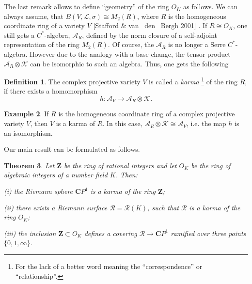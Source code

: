 \documentclass[10pt, reqno]{amsart}
\newtheorem{theorem}{Theorem}[section]
\theoremstyle{definition}
\newtheorem{definition}[theorem]{Definition}
\newtheorem{example}[theorem]{Example}
\theoremstyle{remark}
\numberwithin{equation}{section}
\begin{document}
The last remark  allows to define  ``geometry''  of the ring  $O_K$ as follows. 
We  can always assume,  that  $B(V, \mathcal{L}, \sigma)\cong M_2(R)$, 
where $R$ is the  homogeneous coordinate ring of a variety $V$ 
[Stafford \& van ~den ~Bergh 2001]  \cite[Section 8]{StaVdb1}. 
If $R\cong O_K$,  one still gets  a $C^*$-algebra,  $\mathscr{A}_R$,
 defined by  the norm closure of a self-adjoint representation of  the ring $M_2(R)$.
 Of course,  the  $\mathscr{A}_R$ is no longer 
a Serre $C^*$-algebra.  However  due to the analogy with a  base change,  the  tensor 
product $\mathscr{A}_R\otimes\mathscr{K}$ can be isomorphic  
to such an algebra.   Thus,  one gets  the following 
\begin{definition}
The complex projective variety $V$ is called a {\it karma}
\footnote{For the lack of a better word meaning the ``correspondence'' or ``relationship''.} 
 of the ring $R$, if there exists  a homomorphism 
 \begin{equation}
 h: \mathscr{A}_V\to\mathscr{A}_R\otimes\mathscr{K}. 
 \end{equation}
\end{definition}
\begin{example}
If $R$ is the homogeneous coordinate ring of a complex projective variety $V$, then 
$V$ is a karma of  $R$.  In this case,   $\mathscr{A}_R\otimes\mathscr{K}\cong\mathscr{A}_V$,
i.e. the map $h$ is an isomorphism. 
\end{example}
Our main result can be formulated as follows. 
\begin{theorem}\label{thm1.3}
Let $\mathbf{Z}$ be the ring of rational integers and let $O_K$ be the ring of algebraic 
integers of a number field $K$. Then:


\medskip
(i) the Riemann sphere $\mathbf{C}P^1$ is a karma of the ring $\mathbf{Z}$;

\smallskip
(ii)  there exists a Riemann surface $\mathscr{R}=\mathscr{R}(K)$,  
such that $\mathscr{R}$ is a karma of the  ring  $O_K$;

\smallskip
(iii)  the inclusion $\mathbf{Z}\subset O_K$ defines a covering $\mathscr{R}\to \mathbf{C}P^1$
ramified over three  points $\{0,1, \infty\}$. 
\end{theorem}
\end{document}
